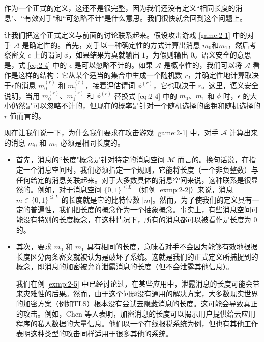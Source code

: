 作为一个正式的定义，这还不是很完整，因为我们还没有定义``相同长度的消息"、``有效对手"和``可忽略不计"是什么意思。我们很快就会回到这个问题上。

让我们把这个正式定义与前面的讨论联系起来。假设攻击游戏 \ref{game:2-1} 中的对手 $\mathcal{A}$ 是确定性的。首先，对手以一种确定性的方式计算出消息 $m_0$和$m_1$，然后考察密文 $c$ 上的谓词 $\phi$，如果结果为真就输出 $1$，为假则输出 $0$。语义安全的意思是，式 \ref{eq:2-4} 中的 $\epsilon$ 是可以忽略不计的。如果 $\mathcal{A}$ 是概率性的，我们可以将 $\mathcal{A}$ 看作是这样的结构：它从某个适当的集合中生成一个随机数 $r$，并确定性地计算取决于$r$的消息 $m^{(r)}_0$ 和 $m^{(r)}_1$，接着评估谓词 $\phi^{(r)}$，它也取决于 $r$。这里，语义安全说明，当用 $m^{(r)}_0$、$m^{(r)}_1$ 和 $\phi^{(r)}$ 替换式 \ref{eq:2-4} 中的 $m_0$、$m_1$ 和 $\phi$ 时，$\epsilon$ 的大小仍然是可以忽略不计的，但现在的概率是针对一个随机选择的密钥和随机选择的 $r$ 值而言的。

\begin{remark}
现在让我们说一下，为什么我们要求在攻击游戏 \ref{game:2-1} 中，对手 $\mathcal{A}$ 计算出来的消息 $m_0$ 和 $m_1$ 必须是相同长度的。
\begin{itemize}
	\item 首先，消息的``长度"概念是针对特定的消息空间 $\mathcal{M}$ 而言的。换句话说，在指定一个消息空间时，我们必须指定一个规则，它能将长度（一个非负整数）与任何给定的消息关联起来。对于大多数具体的消息空间来说，这种联系是很显然的。例如，对于消息空间 $\{0, 1\}^{\leq L}$ （如例 \ref{exmp:2-2}）来说，消息 $m\in\{0, 1\}^{\leq L}$ 的长度就是它的比特位数 $|m|$。然而，为了使我们的定义具有一定的普遍性，我们把长度的概念作为一个抽象概念。事实上，有些消息空间可能没有特别的长度概念，在这种情况下，所有的消息都可以被看作是长度为 $0$ 的。
	\item 其次，要求 $m_0$ 和 $m_1$ 具有相同的长度，意味着对手不会因为能够有效地根据长度区分两条密文就被认为是破坏了系统。这就是我们的正式定义所捕捉到的概念，即消息的加密被允许泄露消息的长度（但不会泄露其他信息）。
		
	我们在例 \ref{exmp:2-5} 中已经讨论过，在某些应用中，泄露消息的长度可能会带来灾难性的后果。然而，由于这个问题没有通用的解决方案，大多数现实世界的加密方案（例如TLS）根本没有尝试去隐藏消息的长度。这可能会导致真正的攻击。例如，Chen 等人表明，加密消息的长度可以揭示用户提供给云应用程序的私人数据的大量信息。他们以一个在线报税系统为例，但也有其他工作表明这种类型的攻击同样适用于很多其他的系统。
\end{itemize}
\end{remark}

